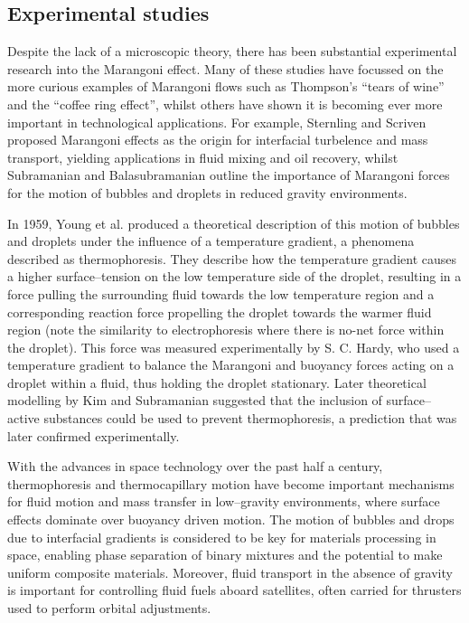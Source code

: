 \subsection{Experimental studies}
Despite the lack of a microscopic theory, there has been substantial experimental research into the Marangoni effect.
Many of these studies have focussed on the more curious examples of Marangoni flows such as Thompson's ``tears of wine''\cite{JThompson,Venerus,Tadmor,Cazabat1995} and the ``coffee ring effect'',\cite{Sefian,HuLarson,Sefiane2014} whilst others have shown it is becoming ever more important in technological applications.
For example, Sternling and Scriven\cite{SternlingScriven} proposed Marangoni effects as the origin for interfacial turbelence and mass transport, yielding applications in fluid mixing and oil recovery,\cite{Aguilera2005,LyfordA,LyfordB} whilst Subramanian and Balasubramanian outline the importance of Marangoni forces for the motion of bubbles and droplets in reduced gravity environments.\cite{MotionOfBubblesAndDrops} 

In 1959, Young et al. produced a theoretical description of this motion of bubbles and droplets under the influence of a temperature gradient, a phenomena described as thermophoresis.\cite{Young1959}
They describe how the temperature gradient causes a higher surface--tension on the low temperature side of the droplet, resulting in a force pulling the surrounding fluid towards the low temperature region and a corresponding reaction force propelling the droplet towards the warmer fluid region (note the similarity to electrophoresis where there is no-net force within the droplet).
This force was measured experimentally by S. C. Hardy,\cite{Hardy1978} who used a temperature gradient to balance the Marangoni and buoyancy forces acting on a droplet within a fluid, thus holding the droplet stationary.
Later theoretical modelling by Kim and Subramanian suggested that the inclusion of surface--active substances could be used to prevent thermophoresis,\cite{KimSubramanianA,KimSubramanianB} a prediction that was later confirmed experimentally.\cite{BartonSubramanian,ChenStebe}

With the advances in space technology over the past half a century, thermophoresis and thermocapillary motion have become important mechanisms for fluid motion and mass transfer in low--gravity environments, where surface effects dominate over buoyancy driven motion.
The motion of bubbles and drops due to interfacial gradients is considered to be key for materials processing in space, enabling phase separation of binary mixtures and the potential to make uniform composite materials.\cite{BartonSubramanian}
Moreover, fluid transport in the absence of gravity is important for controlling fluid fuels aboard satellites, often carried for thrusters used to perform orbital adjustments.\cite{MotionOfBubblesAndDrops} 

